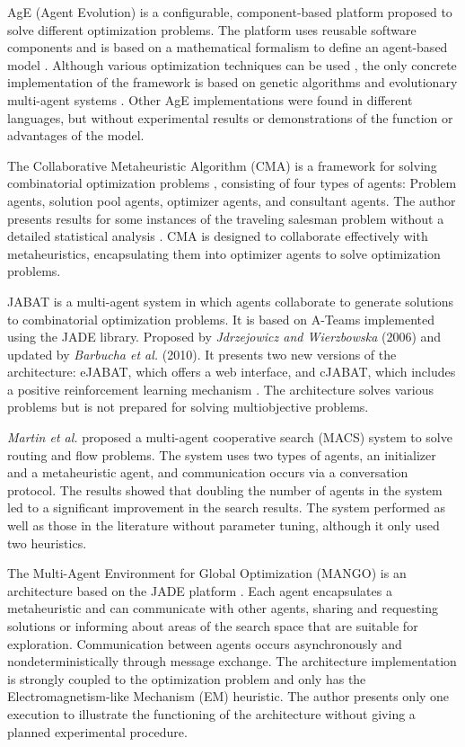 \documentclass[preprint,12pt]{elsarticle}
\begin{document}
AgE (Agent Evolution) is a configurable, component-based platform proposed to solve different optimization problems. The platform uses reusable software components and is based on a mathematical formalism to define an agent-based model \cite{piketak2009functional}. Although various optimization techniques can be used \cite{piketak2013agent}, the only concrete implementation of the framework is based on genetic algorithms and evolutionary multi-agent systems \cite{kisiel2004agent}. Other AgE implementations were found in different languages, but without experimental results or demonstrations of the function or advantages of the model.

The Collaborative Metaheuristic Algorithm (CMA) is a framework for solving combinatorial optimization problems \cite{malek2009},  consisting of four types of agents: Problem agents, solution pool agents, optimizer agents, and consultant agents. The author presents results for some instances of the traveling salesman problem without a detailed statistical analysis \cite{malek2010}. CMA is designed to collaborate effectively with metaheuristics, encapsulating them into optimizer agents to solve optimization problems.

JABAT is a multi-agent system in which agents collaborate to generate solutions to combinatorial optimization problems. It is based on A-Teams implemented using the JADE library. Proposed by \textit{Jdrzejowicz and Wierzbowska} (2006) and updated by \textit{Barbucha et al.} (2010). It presents two new versions of the architecture: eJABAT, which offers a web interface, and cJABAT, which includes a positive reinforcement learning mechanism \cite{jedrzejowicz2006, barbucha2010}. The architecture solves various problems but is not prepared for solving multiobjective problems.

\textit{Martin et al.} \cite{martin2016} proposed a multi-agent cooperative search (MACS) system to solve routing and flow problems. The system uses two types of agents, an initializer and a metaheuristic agent, and communication occurs via a conversation protocol. The results showed that doubling the number of agents in the system led to a significant improvement in the search results. The system performed as well as those in the literature without parameter tuning, although it only used two heuristics.

The Multi-Agent Environment for Global Optimization (MANGO) is an architecture based on the JADE platform \cite{kerccelli2008}. Each agent encapsulates a metaheuristic and can communicate with other agents, sharing and requesting solutions or informing about areas of the search space that are suitable for exploration. Communication between agents occurs asynchronously and nondeterministically through message exchange. The architecture implementation is strongly coupled to the optimization problem and only has the Electromagnetism-like Mechanism (EM) heuristic. The author presents only one execution to illustrate the functioning of the architecture without giving a planned experimental procedure.
\end{document}
